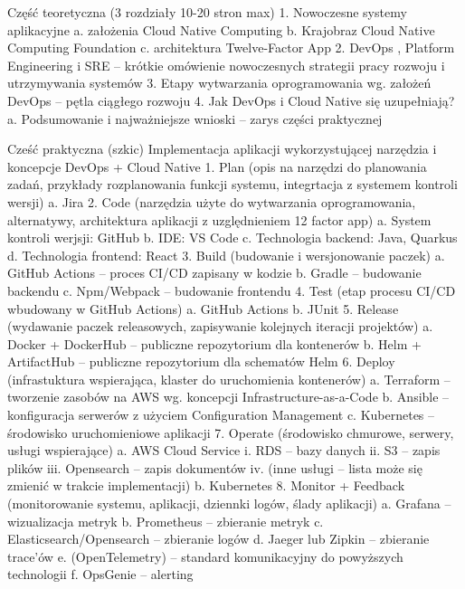 Część teoretyczna (3 rozdziały 10-20 stron max)
1.	Nowoczesne systemy aplikacyjne
a.	założenia Cloud Native Computing 
b.	Krajobraz Cloud Native Computing Foundation 
c.	architektura Twelve-Factor App 
2.	DevOps , Platform Engineering   i SRE  – krótkie omówienie nowoczesnych strategii pracy rozwoju i utrzymywania systemów
3.	Etapy wytwarzania oprogramowania wg. założeń DevOps – pętla ciągłego rozwoju 
4.	Jak DevOps i Cloud Native się uzupełniają?
a.	Podsumowanie i najważniejsze wnioski – zarys części praktycznej

Cześć praktyczna (szkic)
Implementacja aplikacji wykorzystującej narzędzia i koncepcje DevOps + Cloud Native
1.	Plan (opis na narzędzi do planowania zadań, przykłady rozplanowania funkcji systemu, integrtacja z systemem kontroli wersji)
a.	Jira
2.	Code (narzędzia użyte do wytwarzania oprogramowania, alternatywy, architektura aplikacji z uzględnieniem 12 factor app)
a.	System kontroli werjsji: GitHub
b.	IDE: VS Code
c.	Technologia backend: Java, Quarkus
d.	Technologia frontend: React
3.	Build (budowanie i wersjonowanie paczek)
a.	GitHub Actions – proces CI/CD zapisany w kodzie
b.	Gradle – budowanie backendu
c.	Npm/Webpack – budowanie frontendu
4.	Test (etap procesu CI/CD wbudowany w GitHub Actions)
a.	GitHub Actions
b.	JUnit
5.	Release (wydawanie paczek releasowych, zapisywanie kolejnych iteracji projektów) 
a.	Docker + DockerHub – publiczne repozytorium dla kontenerów
b.	Helm + ArtifactHub – publiczne repozytorium dla schematów Helm
6.	Deploy (infrastuktura wspierająca, klaster do uruchomienia kontenerów)
a.	Terraform – tworzenie zasobów na AWS wg. koncepcji Infrastructure-as-a-Code
b.	Ansible – konfiguracja serwerów z użyciem Configuration Management
c.	Kubernetes – środowisko uruchomieniowe aplikacji
7.	Operate (środowisko chmurowe, serwery, usługi wspierające)
a.	AWS Cloud Service
i.	RDS – bazy danych
ii.	S3 – zapis plików
iii.	Opensearch – zapis dokumentów
iv.	(inne usługi – lista może się zmienić w trakcie implementacji)
b.	Kubernetes
8.	Monitor + Feedback (monitorowanie systemu, aplikacji, dziennki logów, ślady aplikacji)
a.	Grafana – wizualizacja metryk
b.	Prometheus – zbieranie metryk
c.	Elasticsearch/Opensearch – zbieranie logów
d.	Jaeger lub Zipkin – zbieranie trace’ów
e.	(OpenTelemetry) – standard komunikacyjny do powyższych technologii
f.	OpsGenie – alerting 